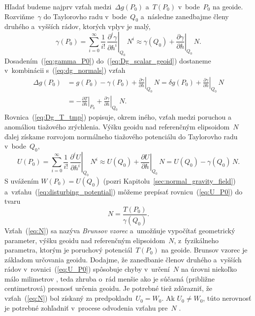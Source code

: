 \documentclass[a4paper,12pt]{book}
\begin{document}
Hľadať budeme najprv vzťah medzi~$\Delta g(P_0)$ a~$T(P_0)$ v~bode~$P_0$ na 
geoide.  Rozviňme~$\gamma$ do Taylorovho radu v~bode~$Q_0$ a~následne 
zanedbajme členy druhého a~vyšších rádov, ktorých vplyv je malý,
%
\begin{equation}
\label{eq:gamma_P0}
\gamma(P_0) = \sum_{i = 0}^\infty \frac{1}{i!} \, \left.\frac{\partial^i 
\gamma}{\partial h^i}\right|_{Q_0} \, N^i \approx \gamma(Q_0) 
+ \left.\frac{\partial \gamma}{\partial h}\right|_{Q_0} \, N{.}
\end{equation}
%
Dosadením~(\ref{eq:gamma_P0}) do~(\ref{eq:Dg_scalar_geoid}) dostaneme 
v~kombinácii s~(\ref{eq:dg_normals}) vzťah
%
\begin{equation}
\label{eq:Dg_T_tmp}
\begin{split}
\Delta g(P_0) &= g(P_0) - \gamma(P_0) + \left.\frac{\partial \gamma}{\partial 
h}\right|_{Q_0} \, N = \delta g(P_0) + \left.\frac{\partial \gamma}{\partial 
h}\right|_{Q_0} \, N\\
%
&=-\left.\frac{\partial T}{\partial h}\right|_{P_0} + \left.\frac{\partial 
\gamma}{\partial h}\right|_{Q_0} \, N{.}
\end{split}
\end{equation}
%
Rovnica~(\ref{eq:Dg_T_tmp}) popisuje, okrem iného, vzťah medzi poruchou 
a anomáliou tiažového zrýchlenia.  Výšku geoidu nad referenčným elipsoidom~$N$ 
ďalej získame rozvojom normálneho tiažového potenciálu do Taylorovho radu 
v~bode~$Q_0$,
%
\begin{equation}
\label{eq:U_P0}
U(P_0) = \sum_{i = 0}^\infty \frac{1}{i!} \, \left.\frac{\partial^i U}{\partial 
h^i}\right|_{Q_0} \, N^i \approx U(Q_0) + \left.\frac{\partial U}{\partial 
h}\right|_{Q_0} \, N = U(Q_0) - \gamma(Q_0) \, N{.}
\end{equation}
%
S uvážením $W(P_0) = U(Q_0)$ (pozri Kapitolu~\ref{sec:normal_gravity_field}) 
a~vzťahu~(\ref{eq:disturbing_potential}) môžeme prepísať 
rovnicu~(\ref{eq:U_P0}) do tvaru
%
\begin{equation}
\label{eq:N}
N = \frac{T(P_0)}{\gamma(Q_0)}.
\end{equation}
%
Vzťah~(\ref{eq:N}) sa nazýva \emph{Brunsov vzorec} a~umožňuje vypočítať 
geometrický parameter, výšku geoidu nad referenčným elipsoidom~$N$, 
z~fyzikálneho parametra, ktorým je poruchový potenciál~$T(P_0)$ na geoide.  
Brunsov vzorec je základom určovania geoidu.  Dodajme, že zanedbanie členov 
druhého a~vyšších rádov v~rovnici~(\ref{eq:U_P0}) spôsobuje chyby v~určení~$N$ 
na úrovni niekoľko málo milimetrov \parencite{Jekeli2015,Sjoberg2017}, teda 
zhruba o~rád menšie ako je súčasná (približne centimetrová) presnosť určenia 
geoidu.  Je potrebné tiež zdôrazniť, že vzťah~(\ref{eq:N}) bol získaný za 
predpokladu~$U_0 = W_0$.  Ak $U_0 \neq W_0$, túto nerovnosť je potrebné 
zohľadniť v~procese odvodenia vzťahu pre~$N$ \parencite[pozri 
napríklad][]{VanicekGeodesy}.
\end{document}
